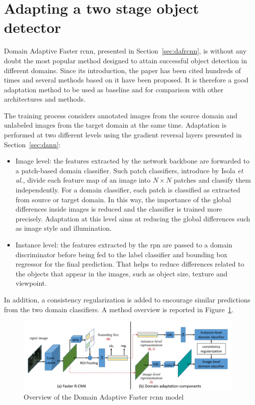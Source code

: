 \documentclass[%
    corpo=12pt,
    twoside,
    stile=classica,   
    tipotesi=magistrale,
    evenboxes,
    english,
	numerazioneromana,
]{toptesi}
\begin{document}
\section{Adapting a two stage object detector}
Domain Adaptive Faster \acrshort{rcnn}\cite{chen2018domain}, presented in Section~\ref{sec:dafrcnn}, is without any doubt the most popular method designed to attain successful object detection in different domains. Since its introduction, the paper has been cited hundreds of times and several methods based on it have been proposed. It is therefore a good adaptation method to be used as baseline and for comparison with other architectures and methods.

The training process considers annotated images from the source domain and unlabeled images from the target domain at the same time. Adaptation is performed at two different levels  using the gradient reversal layers presented in Section~\ref{sec:dann}:

\begin{itemize}
	\item Image level: the features extracted by the network backbone are forwarded to a patch-based domain classifier. Such patch classifiers, introduce by Isola \textit{et al.}\cite{isola2018imagetoimage}, divide each feature map of an image into $ N\times N $ patches and classify them independently. For a domain classifier, each patch is classified as extracted from source or target domain. In this way, the importance of the global differences inside images is reduced and the classifier is trained more precisely. Adaptation at this level aims at reducing the global differences such as image style and illumination.
	\item Instance level: the features extracted by the \gls{rpn} are passed to a domain discriminator before being fed to the label classifier and bounding box regressor for the final prediction. That helps to reduce differences related to the objects that appear in the images, such as object size, texture and viewpoint.
\end{itemize}
In addition, a consistency regularization is added to encourage similar predictions from the two domain classifiers. A method overview is reported in Figure~\ref{fig:dafasterrcnn}.

\begin{figure}[ht]
	\centering
	\includegraphics[width=\linewidth]{imgs/dafasterrcnn.png}
	\caption{Overview of the Domain Adaptive Faster \gls{rcnn} model\cite{chen2018domain}}
	\label{fig:dafasterrcnn}
\end{figure}
\end{document}
